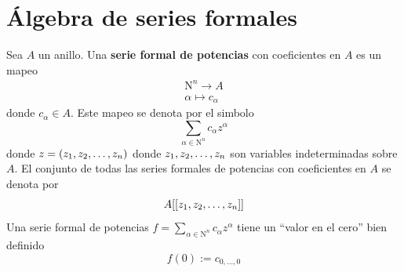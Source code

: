     
\section{Álgebra de series formales}

\begin{definition}
    Sea $A$ un anillo. Una \textbf{serie formal de potencias} con coeficientes en $A$ es un mapeo
    \begin{align*}
        \mathrm{N}^n\to A\\
        \alpha\mapsto c_\alpha
    \end{align*}
    donde $c_\alpha\in A$. Este mapeo se denota por el simbolo
    \begin{equation*}
        \sum_{\alpha\in\mathrm{N}^n}c_{\alpha}z^{\alpha}
    \end{equation*}
    donde $z=(z_1,z_2,\dots,z_n)$ donde $z_1,z_2,\dots,z_n$ son variables indeterminadas sobre $A$. El conjunto de todas las series formales de potencias con coeficientes en $A$ se denota por
    \begin{equation*}
        A[[z_1,z_2,\dots,z_n]]
    \end{equation*}
    Una serie formal de potencias $f=\sum_{\alpha\in\mathrm{N}^n}c_{\alpha}z^{\alpha}$ tiene un \enquote{valor en el cero} bien definido
    \begin{equation*}
        f(0):=c_{0,\dots,0}
    \end{equation*}
\end{definition}

